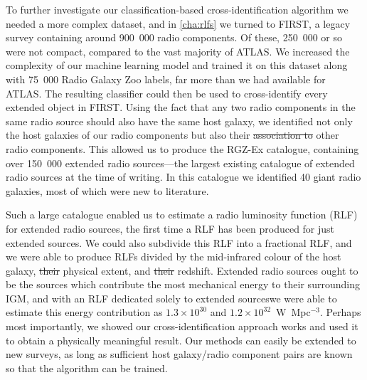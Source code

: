 \documentclass[11pt, a4paper]{book}
\providecommand{\DIFaddtex}[1]{{\protect\color{blue}\uwave{#1}}} %
\providecommand{\DIFdeltex}[1]{{\protect\color{red}\sout{#1}}}                      %
\providecommand{\DIFaddbegin}{} %
\providecommand{\DIFaddend}{} %
\providecommand{\DIFdelbegin}{} %
\providecommand{\DIFdelend}{} %
\providecommand{\DIFadd}[1]{\texorpdfstring{\DIFaddtex{#1}}{#1}} %
\providecommand{\DIFdel}[1]{\texorpdfstring{\DIFdeltex{#1}}{}} %
\newcommand{\DIFscaledelfig}{0.5}
\newlength{\DIFdelgraphicswidth} %
\newlength{\DIFdelgraphicsheight} %
\newcommand{\DIFaddincludegraphics}[2][]{{\color{blue}\fbox{\DIFOincludegraphics[#1]{#2}}}} %
\newcommand{\DIFdelincludegraphics}[2][]{%
\sbox{\DIFdelgraphicsbox}{\DIFOincludegraphics[#1]{#2}}%
\settoboxwidth{\DIFdelgraphicswidth}{\DIFdelgraphicsbox} %
\settoboxtotalheight{\DIFdelgraphicsheight}{\DIFdelgraphicsbox} %
\scalebox{\DIFscaledelfig}{%
\parbox[b]{\DIFdelgraphicswidth}{\usebox{\DIFdelgraphicsbox}\\[-\baselineskip] \rule{\DIFdelgraphicswidth}{0em}}\llap{\resizebox{\DIFdelgraphicswidth}{\DIFdelgraphicsheight}{%
\setlength{\unitlength}{\DIFdelgraphicswidth}%
\begin{picture}(1,1)%
\thicklines\linethickness{2pt} %
{\color[rgb]{1,0,0}\put(0,0){\framebox(1,1){}}}%
{\color[rgb]{1,0,0}\put(0,0){\line( 1,1){1}}}%
{\color[rgb]{1,0,0}\put(0,1){\line(1,-1){1}}}%
\end{picture}%
}\hspace*{3pt}}} %
} %
\DeclareRobustCommand{\DIFaddbegin}{\DIFOaddbegin \let\includegraphics\DIFaddincludegraphics} %
\DeclareRobustCommand{\DIFaddend}{\DIFOaddend \let\includegraphics\DIFOincludegraphics} %
\DeclareRobustCommand{\DIFdelbegin}{\DIFOdelbegin \let\includegraphics\DIFdelincludegraphics} %
\DeclareRobustCommand{\DIFdelend}{\DIFOaddend \let\includegraphics\DIFOincludegraphics} %
\begin{document}
To further investigate our classification-based cross-identification algorithm we \linebreak needed a more complex dataset, and in \autoref{cha:rlfs} we turned to FIRST, a legacy survey containing around 900~000 radio components. Of these, 250~000 or so were not compact, compared to the vast majority of ATLAS. We increased the complexity of our machine learning model and trained it on this dataset along with 75~000 Radio Galaxy Zoo labels, far more than we had available for ATLAS. The resulting classifier could then be used to cross-identify every extended object in FIRST. Using the fact that any two radio components in the same radio source should also have the same host galaxy, we identified not only the host galaxies of our radio components but also their \DIFdelbegin \DIFdel{association to }\DIFdelend \DIFaddbegin \DIFadd{associations with }\DIFaddend other radio components. This allowed us to produce the RGZ-Ex catalogue, containing over 150~000 extended radio sources---the largest existing catalogue of extended radio sources at the time of writing. In this catalogue we identified 40 giant radio galaxies, most of which were new to literature.

Such a large catalogue enabled us to estimate a radio luminosity function (RLF) for extended radio sources, the first time a RLF has been produced for just extended sources. We could also subdivide this RLF into a fractional RLF, and we were able to produce RLFs divided by the mid-infrared colour of the host galaxy, \DIFdelbegin \DIFdel{their }\DIFdelend physical extent, and \DIFdelbegin \DIFdel{their }\DIFdelend redshift. Extended radio sources ought to be the sources which contribute the most mechanical energy to their surrounding IGM, and with an RLF dedicated solely to extended sources\DIFaddbegin \DIFadd{, }\DIFaddend we were able to estimate this energy contribution as $1.3 \times 10^{30}$ and $1.2 \times 10^{32}$~W~Mpc$^{-3}$. Perhaps most importantly, we showed \DIFaddbegin \DIFadd{that }\DIFaddend our cross-identification approach works and used it to obtain a physically meaningful result. Our methods can easily be extended to new surveys, as long as sufficient host galaxy/radio component pairs are known so that the algorithm can be trained.
\end{document}
